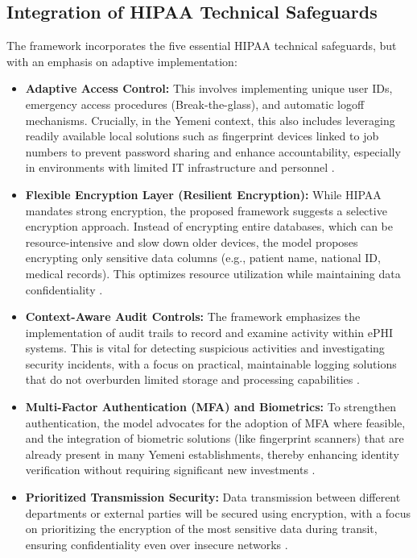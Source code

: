 \documentclass[12pt, a4paper, oneside]{report}
\begin{document}
	\subsection{Integration of HIPAA Technical Safeguards}
	The framework incorporates the five essential HIPAA technical safeguards, but with an emphasis on adaptive implementation:
	\begin{itemize}
		\item \textbf{Adaptive Access Control:} This involves implementing unique user IDs, emergency access procedures (Break-the-glass), and automatic logoff mechanisms. Crucially, in the Yemeni context, this also includes leveraging readily available local solutions such as fingerprint devices linked to job numbers to prevent password sharing and enhance accountability, especially in environments with limited IT infrastructure and personnel \cite{abdulrab2021assessing}.
		\item \textbf{Flexible Encryption Layer (Resilient Encryption):} While HIPAA mandates strong encryption, the proposed framework suggests a selective encryption approach. Instead of encrypting entire databases, which can be resource-intensive and slow down older devices, the model proposes encrypting only sensitive data columns (e.g., patient name, national ID, medical records). This optimizes resource utilization while maintaining data confidentiality \cite{hhs2024hipaa}.
		\item \textbf{Context-Aware Audit Controls:} The framework emphasizes the implementation of audit trails to record and examine activity within ePHI systems. This is vital for detecting suspicious activities and investigating security incidents, with a focus on practical, maintainable logging solutions that do not overburden limited storage and processing capabilities \cite{al2023information}.
		\item \textbf{Multi-Factor Authentication (MFA) and Biometrics:} To strengthen authentication, the model advocates for the adoption of MFA where feasible, and the integration of biometric solutions (like fingerprint scanners) that are already present in many Yemeni establishments, thereby enhancing identity verification without requiring significant new investments \cite{hasegawa2024cybersecurity}.
		\item \textbf{Prioritized Transmission Security:} Data transmission between different departments or external parties will be secured using encryption, with a focus on prioritizing the encryption of the most sensitive data during transit, ensuring confidentiality even over insecure networks \cite{saad2025fuzzy}.
	\end{itemize}
\end{document}
